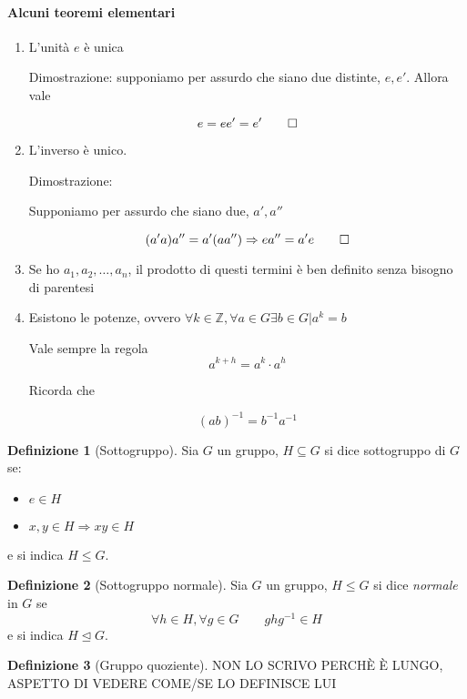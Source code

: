 \documentclass[11pt]{article}
\theoremstyle{plain}
\theoremstyle{definition}
\newtheorem{defn}{Definizione}[section]
\theoremstyle{remark}
\begin{document}
\paragraph{Alcuni teoremi elementari}
\begin{enumerate}
	\item L'unità $e$ è unica
	
	Dimostrazione: supponiamo per assurdo che siano due distinte, $e, e'$. Allora vale
	
	\[e = ee' = e' \qed\]
	
	\item L'inverso è unico.

	Dimostrazione:
	
	Supponiamo per assurdo che siano due, $a', a''$
	
	\[(a' a)a'' = a'(aa'') \Rightarrow e a'' = a' e \qed \]
	
	\item Se ho $a_1, a_2, \ldots, a_n$, il prodotto di questi termini è ben definito senza bisogno di parentesi
	\item Esistono le potenze, ovvero $\forall k \in \mathbb{Z}, \forall a \in G \exists b\in G | a^k = b$
	
	Vale sempre la regola
	\[a^{k+h} = a^k \cdot a^h \]
	
	Ricorda che 
	
	\[ (ab)^{-1} = b^{-1}a^{-1}\]

\end{enumerate}



\begin{defn}[Sottogruppo]
Sia $G$ un gruppo, $H\subseteq G$ si dice sottogruppo di $G$ se:
\begin{itemize}
	\item $e\in H$
	\item $x,y\in H \Rightarrow xy\in H$
\end{itemize}
e si indica $H \leq G$.

\end{defn}

\begin{defn}[Sottogruppo normale]
Sia $G$ un gruppo, $H \leq G$ si dice \textit{normale} in $G$ se
\[
	\forall h\in H, \forall g\in G\qquad ghg^{-1}\in H
\]
e si indica $H \trianglelefteq G$.
\end{defn}

\begin{defn}[Gruppo quoziente]
NON LO SCRIVO PERCHÈ È LUNGO, ASPETTO DI VEDERE COME/SE LO DEFINISCE LUI
\end{defn}
\end{document}
